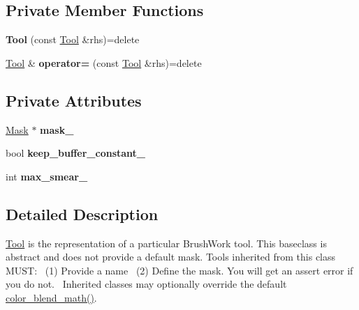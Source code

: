 \subsection*{Private Member Functions}
\begin{DoxyCompactItemize}
\item 
{\bfseries Tool} (const \hyperlink{classimage__tools_1_1Tool}{Tool} \&rhs)=delete\hypertarget{classimage__tools_1_1Tool_adc8752459db983c80f255a8d5dc0a94b}{}\label{classimage__tools_1_1Tool_adc8752459db983c80f255a8d5dc0a94b}

\item 
\hyperlink{classimage__tools_1_1Tool}{Tool} \& {\bfseries operator=} (const \hyperlink{classimage__tools_1_1Tool}{Tool} \&rhs)=delete\hypertarget{classimage__tools_1_1Tool_a61c5da6d429a933acf7d3932c6368e5a}{}\label{classimage__tools_1_1Tool_a61c5da6d429a933acf7d3932c6368e5a}

\end{DoxyCompactItemize}
\subsection*{Private Attributes}
\begin{DoxyCompactItemize}
\item 
\hyperlink{classimage__tools_1_1Mask}{Mask} $\ast$ {\bfseries mask\+\_\+}\hypertarget{classimage__tools_1_1Tool_a318a254280db4cc65ab7e185b1c41db4}{}\label{classimage__tools_1_1Tool_a318a254280db4cc65ab7e185b1c41db4}

\item 
bool {\bfseries keep\+\_\+buffer\+\_\+constant\+\_\+}\hypertarget{classimage__tools_1_1Tool_acbe9c5c5e9f8dca610e5f00ceb2165cb}{}\label{classimage__tools_1_1Tool_acbe9c5c5e9f8dca610e5f00ceb2165cb}

\item 
int {\bfseries max\+\_\+smear\+\_\+}\hypertarget{classimage__tools_1_1Tool_a302c8f65693346d76d026d4306ce293e}{}\label{classimage__tools_1_1Tool_a302c8f65693346d76d026d4306ce293e}

\end{DoxyCompactItemize}


\subsection{Detailed Description}
\hyperlink{classimage__tools_1_1Tool}{Tool} is the representation of a particular Brush\+Work tool. This baseclass is abstract and does not provide a default mask. Tools inherited from this class M\+U\+ST\+:~\newline
(1) Provide a name~\newline
(2) Define the mask. You will get an assert error if you do not.~\newline
Inherited classes may optionally override the default \hyperlink{classimage__tools_1_1Tool_adca00cc3d94a4ca7bdf15d323754e105}{color\+\_\+blend\+\_\+math()}. 

